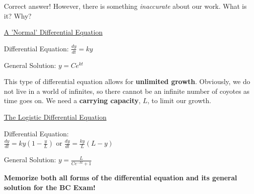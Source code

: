 \documentclass[addpoints, 12pt]{exam}
\begin{document}
Correct answer! However, there is something \textit{inaccurate} about our work. What is it? Why?

\newpage

\begin{center}
    \underline{A 'Normal' Differential Equation}
\end{center}
\begin{minipage}{0.45\linewidth}
    
        Differential Equation: $\displaystyle\frac{dy}{dt}=ky$
    
\end{minipage}
\hfill
\begin{minipage}{0.45\linewidth}
    
        General Solution: $\displaystyle y=Ce^{kt}$
    
\end{minipage}

This type of differential equation allows for \textbf{unlimited growth}. Obviously, we do not live in a world of infinites, so there cannot be an infinite number of coyotes as time goes on. We need a \textbf{carrying capacity}, $L$, to limit our growth. 


\begin{center}
    \underline{The Logistic Differential Equation}
\end{center}
\begin{minipage}{0.45\linewidth}
    
        Differential Equation:\\ 
        $\displaystyle\frac{dy}{dt}=ky(1-\frac{y}{L})$ or $\displaystyle\frac{dy}{dt}=\frac{ky}{L}(L-y)$

\end{minipage}
\hfill
\begin{minipage}{0.45\linewidth}
    
        General Solution: $\displaystyle y=\frac{L}{Ce^{-kt}+1}$
    
\end{minipage}

\vspace{.25in}

\begin{center}
    \textbf{\large Memorize both all forms of the differential equation and its general solution for the BC Exam!}
\end{center}

\vspace{.25in}
\end{document}
